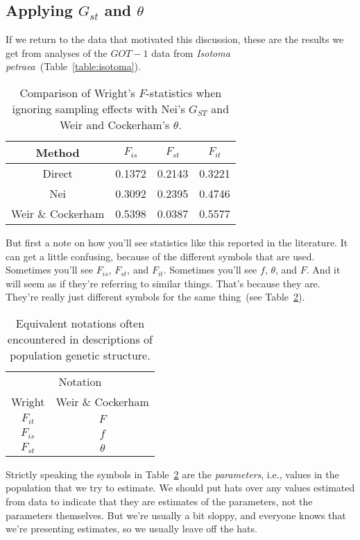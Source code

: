 \subsection*{Applying $G_{st}$ and $\theta$}

If we return to the data that motivated this discussion, these are the
results we get from analyses of the $GOT-1$ data from {\it Isotoma
  petraea}~(Table~\ref{table:isotoma}).
\begin{table}
\begin{center}
  \begin{tabular}{c|ccc}
\hline\hline
Method & $F_{is}$ & $F_{st}$ & $F_{it}$ \\
\hline
Direct            & 0.1372 & 0.2143 & 0.3221 \\
Nei               & 0.3092 & 0.2395 & 0.4746 \\
Weir \& Cockerham & 0.5398 & 0.0387 & 0.5577 \\
\hline
\end{tabular}
\end{center}
\caption{Comparison of Wright's $F$-statistics when ignoring sampling
  effects with Nei's $G_{ST}$ and Weir and Cockerham's $\theta$.}\label{table:fst-comparison}
\end{table}
But first a note on how you'll see statistics like this reported in
the literature. It can get a little confusing, because of the
different symbols that are used. Sometimes you'll see $F_{is}$,
$F_{st}$, and $F_{it}$. Sometimes you'll see $f$, $\theta$, and
$F$. And it will seem as if they're referring to similar
things. That's because they are. They're really just different symbols
for the same thing~(see
Table~\ref{table:fst-theta}).
\begin{table}
\begin{center}
\begin{tabular}{cc}
\hline\hline
\multicolumn{2}{c}{Notation} \\
Wright & Weir \& Cockerham \\
\hline
$F_{it}$ & $F$ \\
$F_{is}$ & $f$ \\
$F_{st}$ & $\theta$ \\
\hline
\end{tabular}
\end{center}
\caption{Equivalent notations often encountered in descriptions of
  population genetic structure.}\label{table:fst-theta}
\end{table}
Strictly speaking the symbols in Table~\ref{table:fst-theta} are the
{\it parameters}, i.e., values in the population that we try to
estimate. We should put hats over any values estimated from data to
indicate that they are estimates of the parameters, not the parameters
themselves. But we're usually a bit sloppy, and everyone knows that
we're presenting estimates, so we usually leave off the hats.

